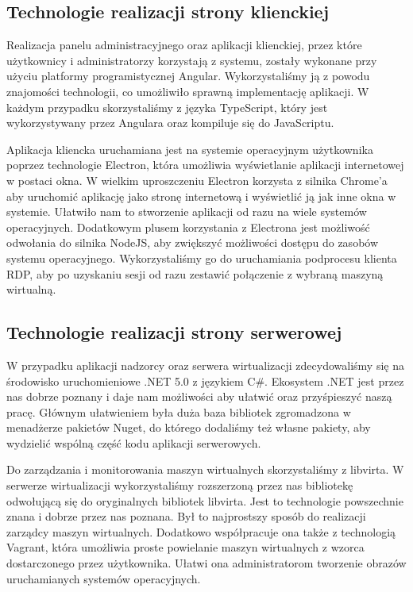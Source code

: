 \documentclass[../opis-rozwiazania.tex]{subfiles}
\begin{document}
\label{technologies}

\subsection{Technologie realizacji strony klienckiej}
Realizacja panelu administracyjnego oraz aplikacji klienckiej, przez które użytkownicy i administratorzy korzystają z systemu, zostały wykonane przy użyciu platformy programistycznej Angular.
Wykorzystaliśmy ją z powodu znajomości technologii, co umożliwiło sprawną implementację aplikacji.
W każdym przypadku skorzystaliśmy z języka TypeScript, który jest wykorzystywany przez Angulara oraz kompiluje się do JavaScriptu.

Aplikacja kliencka uruchamiana jest na systemie operacyjnym użytkownika poprzez technologie Electron, która umożliwia wyświetlanie aplikacji internetowej w postaci okna.
W wielkim uproszczeniu Electron korzysta z silnika Chrome'a aby uruchomić aplikację jako stronę internetową i wyświetlić ją jak inne okna w systemie.
Ułatwiło nam to stworzenie aplikacji od razu na wiele systemów operacyjnych.
Dodatkowym plusem korzystania z Electrona jest możliwość odwołania do silnika NodeJS, aby zwiększyć możliwości dostępu do zasobów systemu operacyjnego.
Wykorzystaliśmy go do uruchamiania podprocesu klienta RDP, aby po uzyskaniu sesji od razu zestawić połączenie z wybraną maszyną wirtualną.

\subsection{Technologie realizacji strony serwerowej}
W przypadku aplikacji nadzorcy oraz serwera wirtualizacji zdecydowaliśmy się na środowisko uruchomieniowe .NET 5.0 z językiem C\#.
Ekosystem .NET jest przez nas dobrze poznany i daje nam możliwości aby ułatwić oraz przyśpieszyć naszą pracę.
Głównym ułatwieniem była duża baza bibliotek zgromadzona w menadżerze pakietów Nuget, do którego dodaliśmy też własne pakiety, aby wydzielić wspólną część kodu aplikacji serwerowych.

Do zarządzania i monitorowania maszyn wirtualnych skorzystaliśmy z libvirta.
W serwerze wirtualizacji wykorzystaliśmy rozszerzoną przez nas bibliotekę odwołującą się do oryginalnych bibliotek libvirta.
Jest to technologie powszechnie znana i dobrze przez nas poznana. Był to najprostszy sposób do realizacji zarządcy maszyn wirtualnych.
Dodatkowo współpracuje ona także z technologią Vagrant, która umożliwia proste powielanie maszyn wirtualnych z wzorca dostarczonego przez użytkownika.
Ułatwi ona administratorom tworzenie obrazów uruchamianych systemów operacyjnych.
\end{document}

